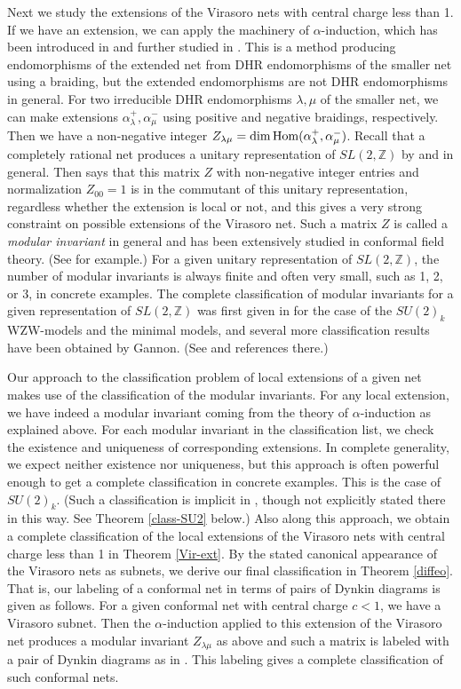 \documentclass[12pt]{article}
\def\Hom{{\rm Hom}}
\def\a{\alpha}
\def\la{\lambda}
\def\Z{{\mathbb Z}}
\begin{document}
Next we study the extensions of the Virasoro nets with central charge
less than 1.  If we have an extension, we can apply the
machinery of $\alpha$-induction, which has been introduced in \cite{LR}
and further studied in \cite{X1,X2,BE,BE4,BEK1,BEK2,BEK3}. 
This is a method producing endomorphisms of the extended net from
DHR endomorphisms of the smaller net using a braiding, but the
extended endomorphisms are not DHR endomorphisms in general.
For two irreducible DHR endomorphisms $\la,\mu$ of the smaller net,
we can make extensions $\a_\la^+,\a_\mu^-$ using positive
and negative braidings, respectively.  Then we have a non-negative
integer $Z_{\la\mu}=\dim\Hom(\a_\la^+,\a_\mu^-)$.
Recall that a completely rational net
produces a unitary representation of $SL(2,\Z)$ by \cite{R1}
and \cite{KLM} in general.
Then \cite[Corollary 5.8]{BEK1} says that 
this matrix $Z$ with non-negative integer entries and normalization
$Z_{00}=1$ is in the commutant of this unitary representation,
regardless whether the extension is local or not, and this
gives a very strong constraint on possible extensions of the Virasoro
net.  Such a matrix $Z$ is called a {\sl modular invariant} in general
and has been extensively studied in conformal
field theory.  (See \cite[Chapter 10]{DMS} for example.)
For a given unitary representation of $SL(2,\Z)$,
the number of modular invariants is always finite and often very
small, such as 1, 2, or 3, in concrete examples.  The complete classification
of modular invariants for a given representation of $SL(2,\Z)$
was first given in \cite{CIZ} for the case of the $SU(2)_k$ WZW-models
and the minimal models, and several more classification results have been
obtained by Gannon.  (See \cite{G} and references there.)

Our approach to the classification problem
of local extensions of a given net makes use of the classification of 
the modular invariants. For any local extension, we have indeed a 
modular invariant coming from the theory of $\alpha$-induction as
explained above.  For each modular invariant in the
classification list, we check the existence and uniqueness of corresponding
extensions.  In complete generality, we expect neither existence
nor uniqueness, but this approach is often powerful enough to get
a complete classification in concrete examples.
This is the case of $SU(2)_k$. (Such a classification is implicit
in \cite{BEK2}, though not explicitly stated there in this way.
See Theorem \ref{class-SU2} below.)
Also along this approach,
we obtain a complete classification of the local extensions of
the Virasoro nets with central charge less than 1 in Theorem
\ref{Vir-ext}.  By the stated canonical appearance of the Virasoro nets 
as subnets, we derive our final classification in Theorem \ref{diffeo}.
That is, our labeling of a conformal net in terms of pairs of Dynkin 
diagrams is given as follows.  For a given conformal net with
central charge $c<1$, we have a Virasoro subnet.  Then the 
$\a$-induction applied to this extension of the Virasoro net produces
a modular invariant $Z_{\la\mu}$ as above and such a matrix is
labeled with a pair of Dynkin diagrams as in \cite{CIZ}.  This
labeling gives a complete classification of such conformal nets. 
\end{document}
